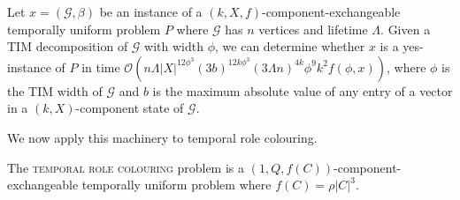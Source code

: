 \documentclass[runningheads]{llncs}
\begin{document}
\begin{theorem}\label{thm:tim}
    Let $x=(\mathcal{G},\beta)$ be an instance of a $(k,X,f)$-component-exchangeable temporally uniform problem $P$ where $\mathcal{G}$ has $n$ vertices and lifetime $\Lambda$. Given a TIM decomposition of $\mathcal{G}$ with width $\phi$, we can determine whether $x$ is a yes-instance of $P$ in time $\mathcal{O}(n\Lambda|X|^{12\phi^3} (3b)^{12 k \phi^ 3} (3\Lambda n)^ {4k} \phi^9k^2f(\phi,x))$, where $\phi$ is the TIM width of $\mathcal{G}$ and $b$ is the maximum absolute value of any entry of a vector in a $(k,X)$-component state of $\mathcal{G}$.
\end{theorem}

We now apply this machinery to temporal role colouring. 
\begin{lemma} \label{lem:1Qf state}
   The \textsc{temporal role colouring} problem is a $(1,Q,f(C))$-component-exchangeable temporally uniform problem where $f(C)=\rho|C|^3$.
\end{lemma}
\end{document}
